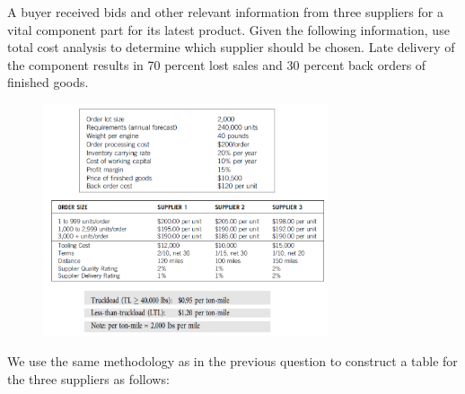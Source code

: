 \documentclass[addpoints]{exam}
\begin{document}
\begin{sloppypar}
\begin{questions}
    \pagebreak
    \question A buyer received bids and other relevant information from three suppliers for a vital component part for its latest product. Given the following information, use total cost analysis to determine which supplier should be chosen. Late delivery of the component results in 70 percent lost sales and 30 percent back orders of finished goods.
    \begin{figure}[ht]
        \centering
        \includegraphics[width=0.75\textwidth]{img3.png}
    \end{figure}
    \begin{solution}
        We use the same methodology as in the previous question to construct a table for the three suppliers as follows:
                

\end{solution}
\end{questions}
\end{sloppypar}
\end{document}
